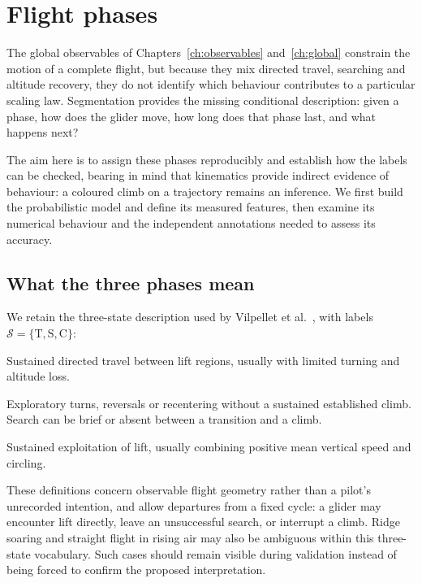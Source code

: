 \chapter{Flight phases}
\label{ch:phases}


The global observables of Chapters~\ref{ch:observables} and~\ref{ch:global} constrain
the motion of a complete flight, but because they mix directed travel, searching and
altitude recovery, they do not identify which behaviour contributes to a particular
scaling law. Segmentation
provides the missing conditional description: given a phase, how does the glider move,
how long does that phase last, and what happens next?

The aim here is to assign these phases reproducibly and establish how the labels can
be checked, bearing in mind that kinematics provide indirect evidence of behaviour:
a coloured climb on a trajectory remains an inference. We first build the probabilistic model and define its measured features, then examine its numerical behaviour and the independent
annotations needed to assess its accuracy.

\section{What the three phases mean}
\label{sec:segmentation}
We retain the three-state description used by Vilpellet et al.~\cite{vilpellet2026},
with labels $\mathcal S=\{\mathrm T,\mathrm S,\mathrm C\}$:
\begin{description}[style=nextline]
  \item[Transition (T).] Sustained directed travel between lift regions, usually with
  limited turning and altitude loss.
  \item[Search (S).] Exploratory turns, reversals or recentering without a sustained
  established climb. Search can be brief or absent between a transition and a climb.
  \item[Climb (C).] Sustained exploitation of lift, usually combining positive mean
  vertical speed and circling.
\end{description}
These definitions concern observable flight geometry rather than a pilot's unrecorded
intention, and allow departures from a fixed cycle: a glider may encounter lift directly, leave
an unsuccessful search, or interrupt a climb. Ridge soaring and straight flight in rising
air may also be ambiguous within this three-state vocabulary. Such cases should remain
visible during validation instead of being forced to confirm the proposed interpretation.

